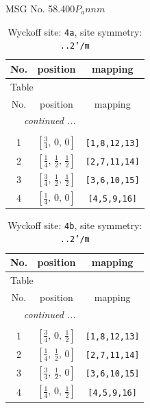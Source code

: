 \documentclass[fleqn,8pt]{jsarticle}
\begin{document}
\setcounter{MaxMatrixCols}{32}

\renewcommand{\tablename}{Table~}
\renewcommand{\figurename}{Figure~}
\begin{center}
\LARGE
MSG No. 58.400\quad$P_{a}nnm$
\end{center}
\renewcommand{\arraystretch}{1.2}
\begin{longtable}{ccc}
\caption{Wyckoff site: {\tt 4a}, site symmetry: {\tt ..2'/m}}
 \\
 \hline \hline
No. & position & mapping \\ \hline \endfirsthead

\multicolumn{2}{l}{\tablename\ \thetable{}} \\
 \hline \hline
No. & position & mapping \\ \hline \endhead

 \hline \hline
\multicolumn{2}{r}{\footnotesize\it continued ...} \\ \endfoot

 \hline \hline
\multicolumn{2}{r}{} \\ \endlastfoot

1 & $\left[ \frac{3}{4},\, 0,\, 0 \right]$ & {\tt [1,8,12,13]} \\ \hline
2 & $\left[ \frac{1}{4},\, \frac{1}{2},\, \frac{1}{2} \right]$ & {\tt [2,7,11,14]} \\ \hline
3 & $\left[ \frac{3}{4},\, \frac{1}{2},\, \frac{1}{2} \right]$ & {\tt [3,6,10,15]} \\ \hline
4 & $\left[ \frac{1}{4},\, 0,\, 0 \right]$ & {\tt [4,5,9,16]} \\
\end{longtable}
\renewcommand{\arraystretch}{1.2}
\begin{longtable}{ccc}
\caption{Wyckoff site: {\tt 4b}, site symmetry: {\tt ..2'/m}}
 \\
 \hline \hline
No. & position & mapping \\ \hline \endfirsthead

\multicolumn{2}{l}{\tablename\ \thetable{}} \\
 \hline \hline
No. & position & mapping \\ \hline \endhead

 \hline \hline
\multicolumn{2}{r}{\footnotesize\it continued ...} \\ \endfoot

 \hline \hline
\multicolumn{2}{r}{} \\ \endlastfoot

1 & $\left[ \frac{3}{4},\, 0,\, \frac{1}{2} \right]$ & {\tt [1,8,12,13]} \\ \hline
2 & $\left[ \frac{1}{4},\, \frac{1}{2},\, 0 \right]$ & {\tt [2,7,11,14]} \\ \hline
3 & $\left[ \frac{3}{4},\, \frac{1}{2},\, 0 \right]$ & {\tt [3,6,10,15]} \\ \hline
4 & $\left[ \frac{1}{4},\, 0,\, \frac{1}{2} \right]$ & {\tt [4,5,9,16]} \\
\end{longtable}
\end{document}

